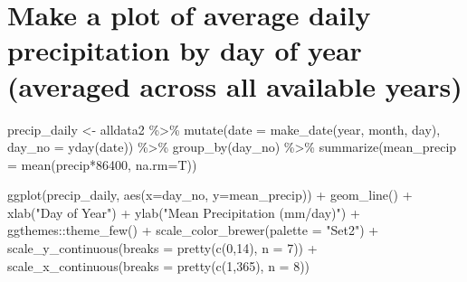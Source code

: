 \documentclass[
]{book}
\newenvironment{Shaded}{\begin{snugshade}}{\end{snugshade}}
\newcommand{\AttributeTok}[1]{\textcolor[rgb]{0.77,0.63,0.00}{#1}}
\newcommand{\DecValTok}[1]{\textcolor[rgb]{0.00,0.00,0.81}{#1}}
\newcommand{\FunctionTok}[1]{\textcolor[rgb]{0.00,0.00,0.00}{#1}}
\newcommand{\NormalTok}[1]{#1}
\newcommand{\OtherTok}[1]{\textcolor[rgb]{0.56,0.35,0.01}{#1}}
\newcommand{\SpecialCharTok}[1]{\textcolor[rgb]{0.00,0.00,0.00}{#1}}
\newcommand{\StringTok}[1]{\textcolor[rgb]{0.31,0.60,0.02}{#1}}
\begin{document}
\hypertarget{make-a-plot-of-average-daily-precipitation-by-day-of-year-averaged-across-all-available-years}{%
\section{Make a plot of average daily precipitation by day of year (averaged across all available years)}\label{make-a-plot-of-average-daily-precipitation-by-day-of-year-averaged-across-all-available-years}}

\begin{Shaded}
\begin{Highlighting}[]
\NormalTok{precip\_daily }\OtherTok{\textless{}{-}}\NormalTok{ alldata2 }\SpecialCharTok{\%\textgreater{}\%}
  \FunctionTok{mutate}\NormalTok{(}\AttributeTok{date =} \FunctionTok{make\_date}\NormalTok{(year, month, day),}
                \AttributeTok{day\_no =} \FunctionTok{yday}\NormalTok{(date)) }\SpecialCharTok{\%\textgreater{}\%}
  \FunctionTok{group\_by}\NormalTok{(day\_no) }\SpecialCharTok{\%\textgreater{}\%}
  \FunctionTok{summarize}\NormalTok{(}\AttributeTok{mean\_precip =} \FunctionTok{mean}\NormalTok{(}\StringTok{\textasciigrave{}}\AttributeTok{precip}\StringTok{\textasciigrave{}}\SpecialCharTok{*}\DecValTok{86400}\NormalTok{, }\AttributeTok{na.rm=}\NormalTok{T))}

\FunctionTok{ggplot}\NormalTok{(precip\_daily, }\FunctionTok{aes}\NormalTok{(}\AttributeTok{x=}\NormalTok{day\_no, }\AttributeTok{y=}\NormalTok{mean\_precip)) }\SpecialCharTok{+} 
      \FunctionTok{geom\_line}\NormalTok{() }\SpecialCharTok{+}
      \FunctionTok{xlab}\NormalTok{(}\StringTok{"Day of Year"}\NormalTok{) }\SpecialCharTok{+} \FunctionTok{ylab}\NormalTok{(}\StringTok{"Mean Precipitation (mm/day)"}\NormalTok{) }\SpecialCharTok{+}
\NormalTok{      ggthemes}\SpecialCharTok{::}\FunctionTok{theme\_few}\NormalTok{() }\SpecialCharTok{+} 
      \FunctionTok{scale\_color\_brewer}\NormalTok{(}\AttributeTok{palette =} \StringTok{"Set2"}\NormalTok{) }\SpecialCharTok{+} 
      \FunctionTok{scale\_y\_continuous}\NormalTok{(}\AttributeTok{breaks =} \FunctionTok{pretty}\NormalTok{(}\FunctionTok{c}\NormalTok{(}\DecValTok{0}\NormalTok{,}\DecValTok{14}\NormalTok{), }\AttributeTok{n =} \DecValTok{7}\NormalTok{)) }\SpecialCharTok{+}
      \FunctionTok{scale\_x\_continuous}\NormalTok{(}\AttributeTok{breaks =} \FunctionTok{pretty}\NormalTok{(}\FunctionTok{c}\NormalTok{(}\DecValTok{1}\NormalTok{,}\DecValTok{365}\NormalTok{), }\AttributeTok{n =} \DecValTok{8}\NormalTok{))}
\end{Highlighting}
\end{Shaded}
\end{document}
